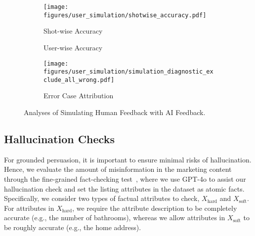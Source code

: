 \begin{figure*}[h]
    \centering
        \begin{subfigure}[t]{0.3\linewidth}
            \centering
            \texttt{[image: figures/user\_simulation/shotwise\_accuracy.pdf]}
            \caption{Shot-wise Accuracy}
            \label{fig: simulation_ssa}
        \end{subfigure}
        \begin{subfigure}[t]{0.3\linewidth}
            \centering
            \caption{User-wise Accuracy}
            \label{fig: simulation_usa}
        \end{subfigure}
    \hspace{0.02\textwidth}
    \begin{subfigure}[t]{0.3\linewidth}
        \centering
        \texttt{[image: figures/user\_simulation/simulation\_diagnostic\_exclude\_all\_wrong.pdf]}
        \caption{Error Case Attribution}
        \label{fig: simulation_diagnostic}
    \end{subfigure}
    \caption{Analyses of Simulating Human Feedback with AI Feedback.}
    \label{fig: simulation-accuracy-hist}
\end{figure*}

\subsection{Hallucination Checks}
\label{sec: exp_hallucination_verification}
For  grounded persuasion, it is important to ensure   minimal risks of hallucination. Hence, we evaluate the amount of misinformation in the marketing content through the fine-grained fact-checking test~\citep{min2023factscore}, where we use GPT-4o to assist our hallucination check and set the listing attributes in the dataset as atomic facts. Specifically, we consider two types of factual attributes to check, $X_{\text{hard}}$ and $X_{\text{soft}}$. 
For attributes in $X_{\text{hard}}$, we require the attribute description to be completely accurate (e.g., the number of bathrooms), whereas we allow attributes in $X_{\text{soft}}$ to be roughly accurate (e.g., the home address). 

